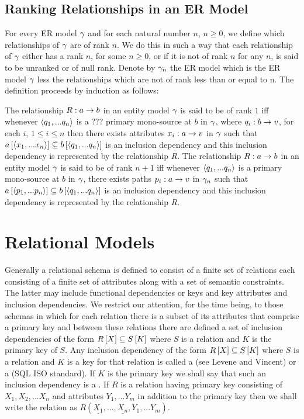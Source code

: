 \subsection{Ranking Relationships in an ER Model}
For every ER model $\gamma$ and for each natural number $n$, $n \geq 0$, we define which relationships of
$\gamma$ are of rank $n$. We do this  in such a way that each relationship of $\gamma$ either has a rank $n$, for some $n \geq 0$, or if it is not of rank 
$n$ for any $n$, is said to be unranked or of null rank. Denote by $\gamma_n$ the ER model which is the ER model 
$\gamma$ less the relationships which are not of rank less than or equal to n. The definition proceeds by induction as follows:
\begin{definition}
The relationship $R: a \rightarrow b$ in an entity model $\gamma$ is said to be of rank $1$ iff whenever 
$\langle q_1,...q_n\rangle$ is a  ??? primary mono-source at $b$ in $\gamma$, where $q_i:b \rightarrow v$, for each $i$, $1 \leq i \leq n$  then there exists attributes $x_i:a \rightarrow v$ in $\gamma$ such that $a\left[\langle x_1,...x_n\rangle\right]\subseteq b\left[\langle q_1,...q_n\rangle\right]$ is an inclusion dependency and this inclusion dependency is represented by the relationship $R$. 
The relationship $R: a \rightarrow b$ in an entity model $\gamma$ is said to be of rank $n+1$ iff whenever 
$\langle q_1,...q_n\rangle$ is a primary mono-source at $b$ in $\gamma$, there exists paths $p_i:a \rightarrow v$ in $\gamma_n$ such that $a\left[\langle p_1,...p_n\rangle\right]\subseteq b\left[\langle q_1,...q_n\rangle\right]$ is an inclusion dependency and this inclusion dependency  is represented by the relationship $R$. 
\end{definition}

\section{Relational Models}
Generally a relational schema is defined to consist of a finite set of relations each consisting of a
finite set of attributes along with a set of semantic constraints. The latter may include functional dependencies or keys and key attributes and inclusion dependencies.  We restrict our attention, for the time being, to those schemas in which for each relation there is a subset of its attributes that comprise a primary key and between these relations there are defined  a set of inclusion dependencies of the 
form $R\left[X\right]\subseteq S\left[K\right]$ where $S$ is a relation and $K$ is the primary key of $S$.
Any inclusion dependency of the form $R\left[X\right]\subseteq S\left[K\right]$ where $S$ is a relation and $K$ is a key for that relation is called a  (see Levene and Vincent) or a  (SQL ISO standard).
If $K$ is the primary key we shall say that such an inclusion dependency is a . If $R$ is a relation having primary key consisting
of $X_1,X_2,...X_n$ and attributes $Y_1,...Y_m$ in addition to the primary key 
 then we shall write the relation as $R(\underline{X_1},...,\underline{X_n},Y_1,...Y_m)$.

